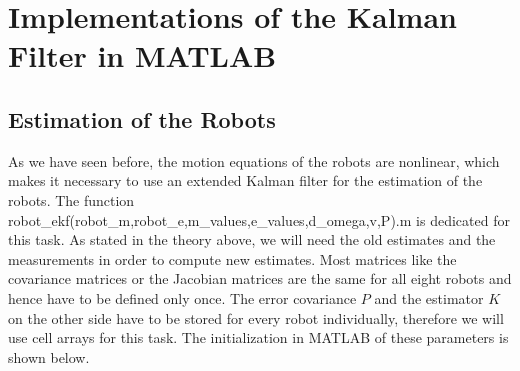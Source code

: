 
\chapter{Implementations of the Kalman Filter in MATLAB}

\section{Estimation of the Robots}

As we have seen before, the motion equations of the robots are nonlinear, which makes it necessary to use an extended Kalman filter for the estimation of the robots. The function {\selectfont robot\_ekf(robot\_m,robot\_e,m\_values,e\_values,d\_omega,v,P).m} is dedicated for this task. As stated in the theory above, we will need the old estimates and the measurements in order to compute new estimates. Most matrices like the covariance matrices or the Jacobian matrices are the same for all eight robots and hence have to be defined only once. The error covariance \(P\) and the estimator \(K\) on the other side have to be stored for every robot individually, therefore we will use cell arrays for this task. The initialization in MATLAB of these parameters is shown below.


\parskip 20pt


